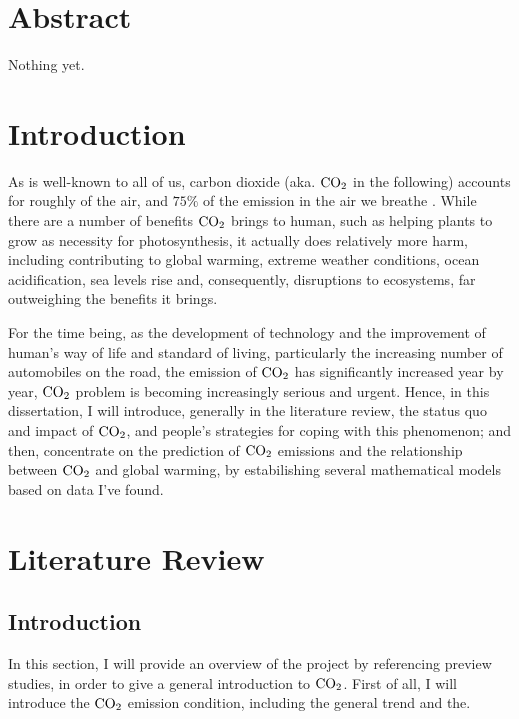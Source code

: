 \documentclass[12pt,a4paper]{article}
\begin{document}
    \maketitle
    \newpage
    \tableofcontents    
    \newpage
    \setlength{\parskip}{1em}   
    
    \section{Abstract}
    Nothing yet.
    \section{Introduction}
    As is well-known to all of us, carbon dioxide (aka. $\ce{CO2}$ in the following) accounts for roughly \label{data} of the air, and $75\%$ of the emission in the air we breathe \label{cite}. While there are a number of benefits $\ce{CO2}$ brings to human, such as helping plants to grow as necessity for photosynthesis, it actually does relatively more harm, including contributing to global warming, extreme weather conditions, ocean acidification, sea levels rise and, consequently, disruptions to ecosystems, far outweighing the benefits it brings.

    For the time being, as the development of technology and the improvement of human's way of life and standard of living, particularly the increasing number of automobiles on the road, the emission of $\ce{CO2}$ has significantly increased year by year, 
    $\ce{CO2}$ problem is becoming increasingly serious and urgent. Hence, in this dissertation, I will introduce, generally in the literature review, the status quo and impact of $\ce{CO2}$, and people's strategies for coping with this phenomenon; and then, concentrate on the prediction of $\ce{CO2}$ emissions and the relationship between $\ce{CO2}$ and global warming, by estabilishing several mathematical models based on data I've found.
        
    \section{Literature Review}
    \subsection{Introduction}
    In this section, I will provide an overview of the project by referencing preview studies, in order to give a general introduction to $\ce{CO2}$. First of all, I will introduce the $\ce{CO2}$ emission condition, including the general trend and the. %
    
\end{document}
